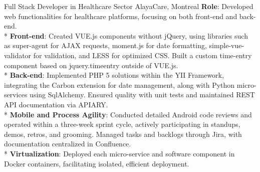 \documentclass[
  a4paper,
   maincolor=cvblue,
   sectioncolor=cvblue,
]{fortysecondscv}
\begin{document}
\begin{cvtable}
    {Full Stack Developer in Healthcare Sector}
    {AlayaCare, Montreal}
    {
      \textbf{Role}: Developed web functionalities for healthcare platforms, focusing on both front-end and back-end.\\
      * \textbf{Front-end}: Created VUE.js components without jQuery, using libraries such as super-agent for AJAX requests, moment.js for date formatting, simple-vue-validator for validation, and LESS for optimized CSS. Built a custom time-entry component based on jquery.timeentry outside of VUE.js.\\
      * \textbf{Back-end}: Implemented PHP 5 solutions within the YII Framework, integrating the Carbon extension for date management, along with Python micro-services using SqlAlchemy. Ensured quality with unit tests and maintained REST API documentation via APIARY.\\
      * \textbf{Mobile and Process Agility}: Conducted detailed Android code reviews and operated within a three-week sprint cycle, actively participating in standups, demos, retros, and grooming. Managed tasks and backlogs through Jira, with documentation centralized in Confluence.\\
      * \textbf{Virtualization}: Deployed each micro-service and software component in Docker containers, facilitating isolated, efficient deployment.\\
    }
\end{cvtable}
\end{document}
